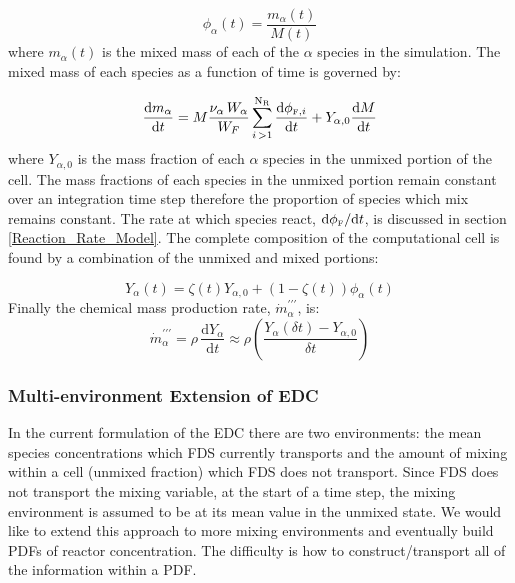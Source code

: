 \begin{equation}\label{eq:phi}
\phi_{\alpha}(t)=\frac{m_{\alpha}(t)}{M(t)}
\end{equation}
where $m_\alpha(t)$ is the mixed mass of each of the $\alpha$ species in the simulation. The mixed mass of each species as a function of time is governed by:

\begin{equation}\label{eq:mixmass}
\frac{\mbox{d}m_{\alpha}}{\mbox{d}t}=M\frac{\nu_{\alpha} \, W_{\alpha}}{W_F}\displaystyle \sum_{i\,>1}^{\mathrm{N_{R}}}\frac{\mbox{d}\phi_{{\tiny \hbox{F}},i}}{\mbox{d}t}+Y_{\alpha,0}\frac{\mbox{d}M}{\mbox{d}t} 
\end{equation}
where $Y_{\alpha,0}$ is the mass fraction of each $\alpha$ species in the unmixed portion of the cell. The mass fractions of each species in the unmixed portion remain constant over an integration time step therefore the proportion of species which mix remains constant. The rate at which species react, $\mbox{d}\phi_{\tiny \hbox{F}}/\mbox{d}t$, is discussed in section \ref{Reaction_Rate_Model}. The complete composition of the computational cell is found by a combination of the unmixed and mixed portions:

\begin{equation}\label{eq:final_comp}
Y_{\alpha}(t)=\zeta(t)Y_{\alpha,0}+(1-\zeta(t))\phi_{\alpha}(t)
\end{equation}
Finally the chemical mass production rate, $\dot{m}^{\prime\prime\prime}_{\alpha}$, is:
\begin{equation}\label{mass_prod_rate}
\dot{m}^{\prime\prime\prime}_{\alpha}=\rho \,\frac{\mbox{d}Y_{\alpha}}{\mbox{d}t} \approx \rho \left(\frac{Y_{\alpha}(\delta t) - Y_{\alpha,0}}{\delta t}\right)
\end{equation}

\subsubsection{Multi-environment Extension of EDC}
In the current formulation of the EDC there are two environments: the mean species concentrations which FDS currently transports and the amount of mixing within a cell (unmixed fraction) which FDS does not transport. Since FDS does not transport the mixing variable, at the start of a time step, the mixing environment is assumed to be at its mean value in the unmixed state. We would like to extend this approach to more mixing environments and eventually build PDFs of reactor concentration. The difficulty is how to construct/transport all of the information within a PDF.

